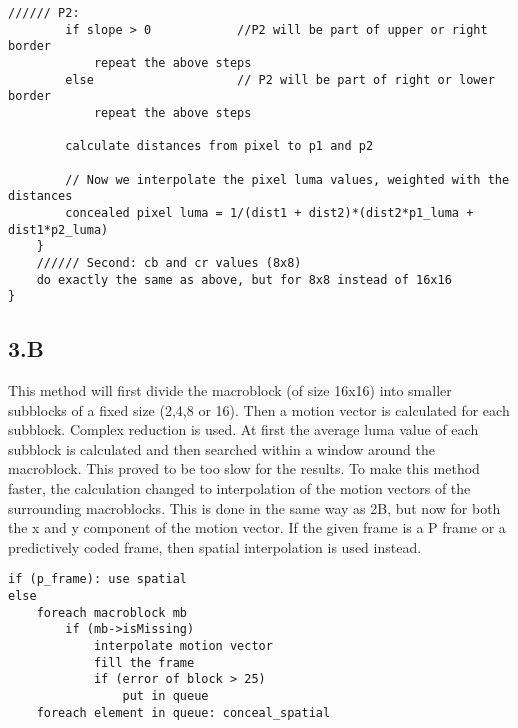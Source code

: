 \begin{lstlisting}[frame=single]
		////// P2:
		if slope > 0			//P2 will be part of upper or right border
			repeat the above steps
		else					// P2 will be part of right or lower border
			repeat the above steps
	
		calculate distances from pixel to p1 and p2
	
		// Now we interpolate the pixel luma values, weighted with the distances
		concealed pixel luma = 1/(dist1 + dist2)*(dist2*p1_luma + dist1*p2_luma)	
	}
	////// Second: cb and cr values (8x8)    
	do exactly the same as above, but for 8x8 instead of 16x16		
}

\end{lstlisting}

\subsection{3.B}
This method will first divide the macroblock (of size 16x16) into smaller subblocks of a fixed size (2,4,8 or 16). Then a motion vector is calculated for each subblock. Complex reduction is used. At first the average luma value of each subblock is calculated and then searched within a window around the macroblock. This proved to be too slow for the results. To make this method faster, the calculation changed to interpolation of the motion vectors of the surrounding macroblocks. This is done in the same way as 2B, but now for both the x and y component of the motion vector. If the given frame is a P frame or a predictively coded frame, then spatial interpolation is used instead. 

\begin{lstlisting}[frame=single]
if (p_frame): use spatial
else
	foreach macroblock mb
    	if (mb->isMissing)
        	interpolate motion vector
            fill the frame
            if (error of block > 25) 
            	put in queue
	foreach element in queue: conceal_spatial
\end{lstlisting}

